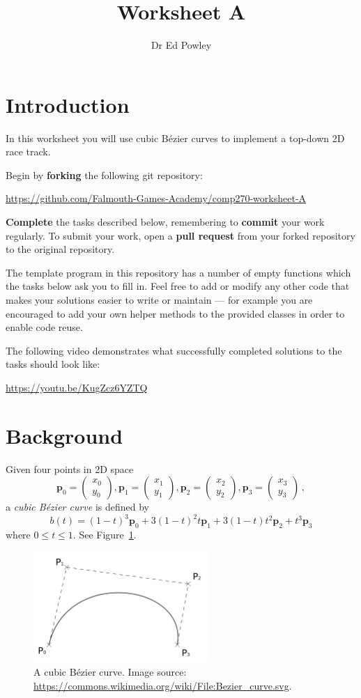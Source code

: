 \documentclass{../../../fal_assignment}
\title{Worksheet A}
\author{Dr Ed Powley}
\newcommand{\colvec}[2]{\begin{pmatrix}#1\\#2\end{pmatrix}}
\newcommand{\colxy}[1]{\colvec{x_{#1}}{y_{#1}}}
\begin{document}
\maketitle

\section*{Introduction}

In this worksheet you will use cubic B\'ezier curves to implement a top-down 2D race track.

Begin by \textbf{forking} the following git repository:

\begin{center}
	\url{https://github.com/Falmouth-Games-Academy/comp270-worksheet-A}
\end{center}

\textbf{Complete} the tasks described below, remembering to \textbf{commit} your work regularly.
To submit your work, open a \textbf{pull request} from your forked repository to the original repository.

The template program in this repository has a number of empty functions which the tasks below ask you to fill in. Feel free to add or modify any other code that makes your solutions easier to write or maintain ---
for example you are encouraged to add your own helper methods to the provided classes in order to enable code reuse.

The following video demonstrates what successfully completed solutions to the tasks should look like:

\begin{center}
	\url{https://youtu.be/KugZcz6YZTQ}
\end{center}

\section*{Background}

Given four points in 2D space
$$ \mathbf{p}_0 = \colxy0, \mathbf{p}_1 = \colxy1, \mathbf{p}_2 = \colxy2, \mathbf{p}_3 = \colxy3 \,, $$
a \emph{cubic B\'ezier curve} is defined by
$$ b(t) = (1-t)^3 \mathbf{p}_0 + 3(1-t)^2t \mathbf{p}_1 + 3(1-t)t^2 \mathbf{p}_2 + t^3 \mathbf{p}_3 $$
where $0 \leq t \leq 1$. See Figure~\ref{fig:bezier}.

\begin{figure}[ht]
	\begin{center}
		\includegraphics[width=0.6\textwidth]{bezier}
	\end{center}
	\caption{A cubic B\'ezier curve. Image source: \protect\url{https://commons.wikimedia.org/wiki/File:Bezier_curve.svg}.}
	\label{fig:bezier}
\end{figure}
\end{document}

